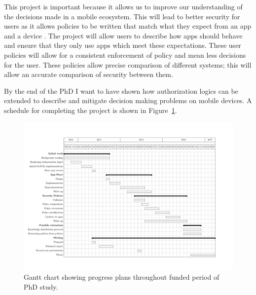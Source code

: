 \documentclass[a4paper]{article}
\begin{document}

This project is important because it allows us to improve our understanding of
the decisions made in a mobile ecosystem.  This will lead to better security for users as it allows
policies to be written that match what they expect from an app and a device .
The project will allow users to describe how apps should
behave and ensure that they only use apps which meet these expectations.  These
user policies will allow for a consistent
enforcement of policy and mean less decisions for the user.  These policies allow
precise comparison of different systems; this will allow an accurate comparison
of security between them.

By the end of the PhD I want to have shown how authorization logics can be
extended to describe and mitigate decision making problems on mobile devices.
A schedule for completing the project is shown in Figure~\ref{fig:gantt}.

\vfill
\begin{figure}
  \includegraphics[width=1.3\linewidth,angle=90]{gantt.pdf}
  \caption{Gantt chart showing progress plans throughout funded period of PhD
  study.}\label{fig:gantt}
\end{figure}
\pagebreak


\appendix

\end{document}
